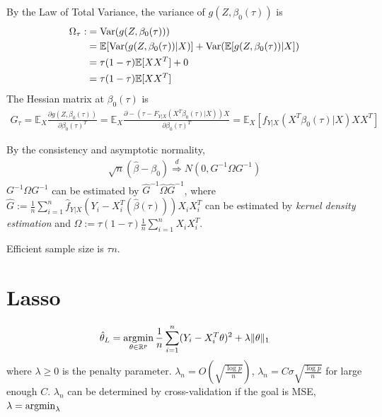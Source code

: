 \documentclass[11pt]{elegantbook}
\newcommand{\argmin}{\operatornamewithlimits{argmin}}
\begin{document}
By the Law of Total Variance, the variance of $g(Z,\beta_0(\tau))$ is
\begin{equation}
    \begin{aligned}
        \Omega_\tau:&=\textnormal{Var}(g(Z,\beta_0(\tau)))\\
        &=\mathbb{E}[\textnormal{Var}(g(Z,\beta_0(\tau))|X)]+\textnormal{Var}(\mathbb{E}[g(Z,\beta_0(\tau))|X])\\
        &=\tau(1-\tau) \mathbb{E}[XX^T]+0\\
        &=\tau(1-\tau) \mathbb{E}[XX^T]
    \end{aligned}
    \nonumber
\end{equation}
The Hessian matrix at $\beta_0(\tau)$ is
\begin{equation}
    \begin{aligned}
        G_\tau=\mathbb{E}_X\frac{\partial g(Z,\beta_0(\tau))}{\partial \beta_0(\tau)^T}=\mathbb{E}_X\frac{\partial -(\tau-F_{Y|X}(X^T\beta_0(\tau)|X))X}{\partial \beta_0(\tau)^T}=\mathbb{E}_X\left[f_{Y|X}(X^T\beta_0(\tau)|X)XX^T\right]
    \end{aligned}
    \nonumber
\end{equation}

By the consistency and asymptotic normality,
\begin{equation}
    \begin{aligned}
        \sqrt{n}\left(\hat{\beta}-\beta_0\right) \stackrel{d}{\Rightarrow} N\left(0,G^{-1}\Omega G^{-1}\right)
    \end{aligned}
    \nonumber
\end{equation}
$G^{-1}\Omega G^{-1}$ can be estimated by $\hat{G}^{-1}\hat{\Omega}\hat{G}^{-1}$, where $\hat{G}:=\frac{1}{n}\sum_{i=1}^n\hat{f}_{Y|X}\left(Y_i-X_i^T(\hat{\beta}(\tau))\right)X_iX_i^T$ can be estimated by \textit{kernel density estimation} and $\hat{\Omega}:=\tau(1-\tau)\frac{1}{n}\sum_{i=1}^nX_iX_i^T$.


Efficient sample size is $\tau n$.

\section{Lasso}
$$\hat{\theta}_L=\argmin_{\theta\in \mathbb{R}^p}\frac{1}{n}\sum_{i=1}^n(Y_i-X_i^T\theta)^2+\lambda\|\theta\|_1$$
where $\lambda\geq 0$ is the penalty parameter. $\lambda_n=O\left(\sqrt{\frac{\log p}{n}}\right)$, $\lambda_n=C\sigma\sqrt{\frac{\log p}{n}}$ for large enough $C$. $\lambda_n$ can be determined by cross-validation if the goal is MSE, $\lambda=\argmin_{\lambda}$
\end{document}
